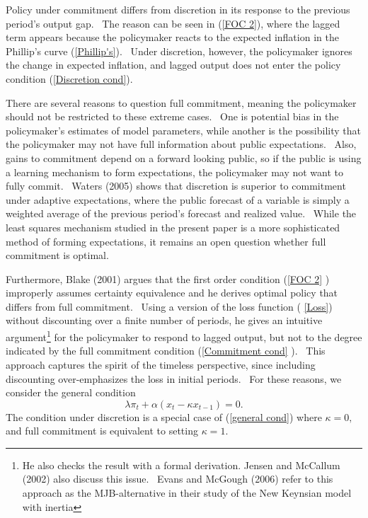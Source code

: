 \documentclass{article}
\begin{document}
\begin{doublespace}
Policy under commitment differs from discretion in its response to the
previous period's output gap. \ The reason can be seen in (\ref{FOC 2}),
where the lagged term appears because the policymaker reacts to the expected
inflation in the Phillip's curve (\ref{Phillip's}). \ Under discretion,
however, the policymaker ignores the change in expected inflation, and
lagged output does not enter the policy condition (\ref{Discretion cond}). \ 

There are several reasons to question full commitment, meaning the
policymaker should not be restricted to these extreme cases. \ One is
potential bias in the policymaker's estimates of model parameters, while
another is the possibility that the policymaker may not have full
information about public expectations. \ Also, gains to commitment depend on
a forward looking public, so if the public is using a learning mechanism to
form expectations, the policymaker may not want to fully commit. \ Waters
(2005) shows that discretion is superior to commitment under adaptive
expectations, where the public forecast of a variable is simply a weighted
average of the previous period's forecast and realized value. \ While the
least squares mechanism studied in the present paper is a more sophisticated
method of forming expectations, it remains an open question whether full
commitment is optimal. \ 

Furthermore, Blake (2001) argues that the first order condition (\ref{FOC 2}%
) improperly assumes certainty equivalence and he derives optimal policy
that differs from full commitment. \ Using a version of the loss function (%
\ref{Loss}) without discounting over a finite number of periods, he gives an
intuitive argument\footnote{%
He also checks the result with a formal derivation. Jensen and McCallum
(2002) also discuss this issue. \ Evans and McGough (2006) refer to this
approach as the MJB-alternative in their study of the New Keynsian model
with inertia} for the policymaker to respond to lagged output, but not to
the degree indicated by the full commitment condition (\ref{Commitment cond}%
). \ This approach captures the spirit of the timeless perspective, since
including discounting over-emphasizes the loss in initial periods. \ For
these reasons, we consider the general condition%
\begin{equation}
\lambda \pi _{t}+\alpha \left( x_{t}-\kappa x_{t-1}\right) =0.
\label{general cond}
\end{equation}%
The condition under discretion is a special case of (\ref{general cond})
where $\kappa =0,$ and full commitment is equivalent to setting $\kappa =1$.
\ 


\end{doublespace}
\end{document}
